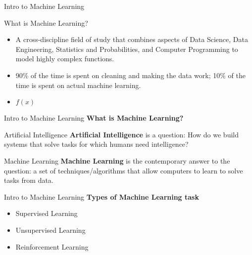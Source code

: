 \documentclass{beamer}
\begin{document}
\begin{frame}[fragile]{Intro to Machine Learning}
    \begin{block}{What is Machine Learning?}
        \begin{itemize}
            \item A cross-discipline field of study that combines aspects of Data Science, Data Engineering, Statistics and Probabilities, and Computer Programming to model highly complex functions.
            \pause
            \item 90\% of the time is spent on cleaning and making the data work; 10\% of the time is spent on actual machine learning.
            \item \huge $f(x)$
        \end{itemize}
    \end{block}
\end{frame}
\begin{frame}[fragile]{Intro to Machine Learning}
    \textbf{What is Machine Learning?}
    \begin{block}{Artificial Intelligence}
        \textbf{Artificial Intelligence} is a question: How do we build systems that solve tasks for which humans need intelligence?
    \end{block}
    \begin{block}{Machine Learning}
        \textbf{Machine Learning} is the contemporary answer to the question: a set of techniques/algorithms that allow computers to learn to solve tasks from data.
    \end{block}
\end{frame}

\begin{frame}[fragile]{Intro to Machine Learning}
    \textbf{Types of Machine Learning task}
    \begin{itemize}
        \item Supervised Learning
        \item Unsupervised Learning
        \item Reinforcement Learning
    \end{itemize}
\end{frame}
\end{document}
